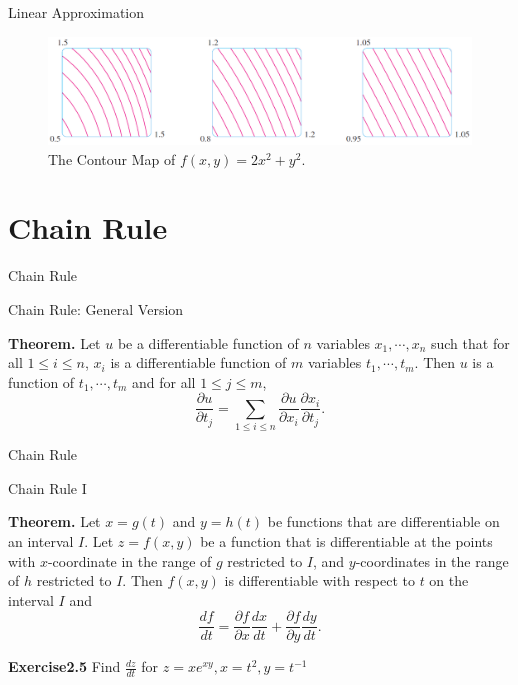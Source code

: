\documentclass[aspectratio=169, UTF8]{ctexbeamer}
\begin{document}
    \begin{frame}{Linear Approximation}
        \begin{figure}
            \includegraphics[width = 13cm]{f14}
            \caption{The Contour Map of $f(x,y) = 2x^2 + y^2$.}
        \end{figure}
    \end{frame}

\section{Chain Rule}
    \begin{frame}[label=7]{Chain Rule}
        \begin{block}{Chain Rule: General Version}
            \par \textbf{Theorem.} Let $u$ be a differentiable function of $n$ variables $x_1, \cdots, x_n$ such that for all $1 \leq i \leq n$, $x_i$ is a differentiable function of $m$ variables $t_1, \cdots, t_m$. Then $u$ is a function of $t_1, \cdots, t_m$ and for all $1 \leq j \leq m$, 
            \begin{equation*}
                \dfrac{\partial u}{\partial t_j} = \sum\limits_{1 \leq i \leq n} \dfrac{\partial u}{\partial x_i} \dfrac{\partial x_i}{\partial t_j}.
            \end{equation*}
        \end{block}
    \end{frame}

    \begin{frame}[t]{Chain Rule}
        \begin{block}{Chain Rule I}
            \par \textbf{Theorem.} Let $x = g(t)$ and $y = h(t)$ be functions that are differentiable on an interval $I$. Let $z = f(x,y)$ be a function that is differentiable at the points with $x$-coordinate in the range of $g$ restricted to $I$, and $y$-coordinates in the range of $h$ restricted to $I$. Then $f(x,y)$ is differentiable with respect to $t$ on the interval $I$ and 
            \begin{equation*}
                \dfrac{df}{dt} = \dfrac{\partial f}{\partial x} \dfrac{dx}{dt} + \dfrac{\partial f}{\partial y} \dfrac{dy}{dt} .
            \end{equation*}
        \end{block}
        \par \textbf{Exercise2.5} Find $\frac{dz}{dt}$ for $z = xe^{xy}, x = t^2, y = t^{-1}$
    \end{frame}
\end{document}
